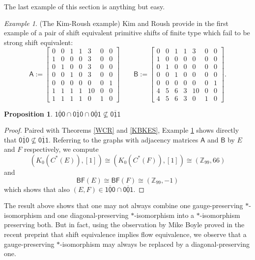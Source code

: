 \documentclass[12pt]{amsbook}%
\newtheorem{propo}[theor]{Proposition}
\theoremstyle{defin}
\theoremstyle{remark}
\newtheorem{examp}[theor]{Example}
\numberwithin{equation}{chapter}
\numberwithin{theor}{section}
\newcommand{\ZZ}{\mathbb{Z}}
\newcommand{\BF}{\mathsf{BF}}
\newcommand{\xyzrel}[1]{\mbox{$\overline{\underline{\mathsf{ #1}}}$}}
\begin{document}
  The last example of this section is anything but easy.
  
    \begin{examp}\label{kimroushex} (The Kim-Roush example) 
Kim and Roush provide in \cite{khkfwr:wcfis} the first example of a pair of shift equivalent primitive shifts of finite type which fail to be strong shift equivalent:
\[
\mathsf{A}:=\begin{bmatrix}0&0&1&1&3&0&0\\1&0&0&0&3&0&0\\0&1&0&0&3&0&0\\0&0&1&0&3&0&0\\0&0&0&0&0&0&1\\1&1&1&1&10&0&0\\1&1&1&1&0&1&0\end{bmatrix}\qquad
\mathsf{B}:=\begin{bmatrix}
0&0&1&1&3&0&0\\1&0&0&0&0&0&0\\0&1&0&0&0&0&0\\0&0&1&0&0&0&0\\0&0&0&0&0&0&1\\4&5&6&3&10&0&0\\4&5&6&3&0&1&0
\end{bmatrix}.
\]
\end{examp}
  
  \begin{propo}\label{kimroush}
  $\xyzrel{100}\cap\xyzrel{010}\cap\xyzrel{001}\not\subseteq \xyzrel{011}$
  \end{propo}
  \begin{proof}
  Paired with Theorems 
\ref{WCR} and \ref{KBKES}, Example   \ref{kimroushex} shows directly that $\xyzrel{010}\not\subseteq \xyzrel{011}$. Referring to the graphs with adjacency matrices $\mathsf{A}$ and $\mathsf{B}$  by $E$ and $F$ respectively, we compute
 \[
 (K_0(C^*(E)),[1]) \cong  (K_0(C^*(F)),[1]) \cong (\ZZ_{99},66)
 \]
 and
 \[
\BF(E)\cong \BF(F)\cong (\ZZ_{99},-1)
\]
 which shows that also $(E,F)\in \xyzrel{100}\cap\xyzrel{001}$. 
   \end{proof}
  
The result above shows that one may not always combine one gauge-preserving $*$-isomorphism and one diagonal-preserving $*$-isomorphism into a $*$-isomorphism preserving both. But in fact,
using the observation by Mike Boyle proved in the recent preprint \cite{mb:seifesft} that shift equivalence implies flow equivalence, we observe that a gauge-preserving $*$-isomorphism may always be replaced by a diagonal-preserving one.
\end{document}
